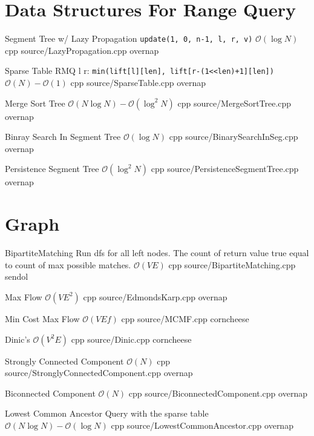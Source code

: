 \documentclass[landscape, 10pt, a4paper, oneside, twocolumn]{extarticle}
\begin{document}
\maketitlepage



\section{Data Structures For Range Query}

\Algorithm
{Segment Tree w/ Lazy Propagation}
{\texttt{update(1, 0, n-1, l, r, v)}}
{$\mathcal{O}(\log{N})$}
{cpp}
{source/LazyPropagation.cpp}
{overnap}

\Algorithm
{Sparse Table}
{RMQ l r: \texttt{min(lift[l][len], lift[r-(1<<len)+1][len])}}
{$\mathcal{O}(N)-\mathcal{O}(1)$}
{cpp}
{source/SparseTable.cpp}
{overnap}

\Algorithm
{Merge Sort Tree}
{}
{$\mathcal{O}(N\log{N})-\mathcal{O}(\log^2{N})$}
{cpp}
{source/MergeSortTree.cpp}
{overnap}

\Algorithm
{Binray Search In Segment Tree}
{}
{$\mathcal{O}(\log{N})$}
{cpp}
{source/BinarySearchInSeg.cpp}
{overnap}

\Algorithm
{Persistence Segment Tree}
{}
{$\mathcal{O}(\log^2{N})$}
{cpp}
{source/PersistenceSegmentTree.cpp}
{overnap}

\section{Graph}

\Algorithm
{BipartiteMatching}
{Run dfs for all left nodes. The count of return value true equal to count of max possible matches.}
{$\mathcal{O}(VE)$}
{cpp}
{source/BipartiteMatching.cpp}
{sendol}

\Algorithm
{Max Flow}
{}
{$\mathcal{O}(VE^2)$}
{cpp}
{source/EdmondsKarp.cpp}
{overnap}

\Algorithm
{Min Cost Max Flow}
{}
{$\mathcal{O}(VEf)$}
{cpp}
{source/MCMF.cpp}
{corncheese}

\Algorithm
{Dinic's}
{}
{$\mathcal{O}(V^2E)$}
{cpp}
{source/Dinic.cpp}
{corncheese}

\Algorithm
{Strongly Connected Component}
{}
{$\mathcal{O}(N)$}
{cpp}
{source/StronglyConnectedComponent.cpp}
{overnap}

\Algorithm
{Biconnected Component}
{}
{$\mathcal{O}(N)$}
{cpp}
{source/BiconnectedComponent.cpp}
{overnap}

\Algorithm
{Lowest Common Ancestor}
{Query with the sparse table}
{$\mathcal{O}(N\log{N})-\mathcal{O}(\log{N})$}
{cpp}
{source/LowestCommonAncestor.cpp}
{overnap}
\end{document}
